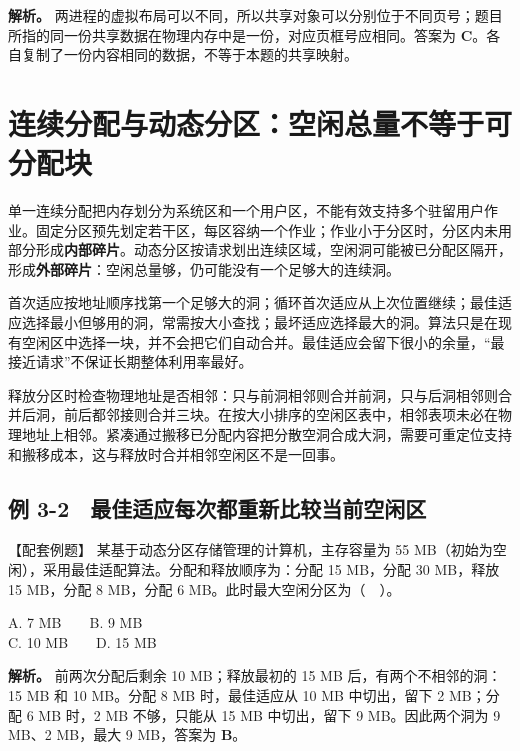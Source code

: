 \textbf{解析。} 两进程的虚拟布局可以不同，所以共享对象可以分别位于不同页号；题目所指的同一份共享数据在物理内存中是一份，对应页框号应相同。答案为 \textbf{C}。各自复制了一份内容相同的数据，不等于本题的共享映射。

\section{连续分配与动态分区：空闲总量不等于可分配块}\label{OS03-5-3}

单一连续分配把内存划分为系统区和一个用户区，不能有效支持多个驻留用户作业。固定分区预先划定若干区，每区容纳一个作业；作业小于分区时，分区内未用部分形成\textbf{内部碎片}。动态分区按请求划出连续区域，空闲洞可能被已分配区隔开，形成\textbf{外部碎片}：空闲总量够，仍可能没有一个足够大的连续洞。

首次适应按地址顺序找第一个足够大的洞；循环首次适应从上次位置继续；最佳适应选择最小但够用的洞，常需按大小查找；最坏适应选择最大的洞。算法只是在现有空闲区中选择一块，并不会把它们自动合并。最佳适应会留下很小的余量，``最接近请求''不保证长期整体利用率最好。

释放分区时检查物理地址是否相邻：只与前洞相邻则合并前洞，只与后洞相邻则合并后洞，前后都邻接则合并三块。在按大小排序的空闲区表中，相邻表项未必在物理地址上相邻。紧凑通过搬移已分配内容把分散空洞合成大洞，需要可重定位支持和搬移成本，这与释放时合并相邻空闲区不是一回事。

\subsection{例 3-2　最佳适应每次都重新比较当前空闲区}\label{OS03-ex5-2}

\begin{example}[配套例题]

【配套例题】 某基于动态分区存储管理的计算机，主存容量为 55 MB（初始为空闲），采用最佳适配算法。分配和释放顺序为：分配 15 MB，分配 30 MB，释放 15 MB，分配 8 MB，分配 6 MB。此时最大空闲分区为（　）。

A. 7 MB　　B. 9 MB\\
C. 10 MB　　D. 15 MB

\end{example}

\textbf{解析。} 前两次分配后剩余 10 MB；释放最初的 15 MB 后，有两个不相邻的洞：15 MB 和 10 MB。分配 8 MB 时，最佳适应从 10 MB 中切出，留下 2 MB；分配 6 MB 时，2 MB 不够，只能从 15 MB 中切出，留下 9 MB。因此两个洞为 9 MB、2 MB，最大 9 MB，答案为 \textbf{B}。

